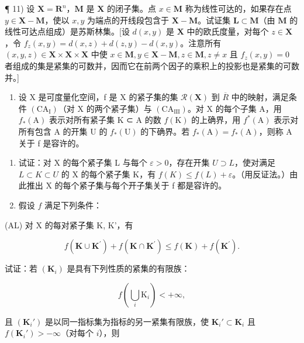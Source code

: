 ¶ 11) 设 \(\mathbf{X} = \mathbf{R}^n\)，\(\mathbf{M}\) 是 \(\mathbf{X}\) 的闭子集。点 \(x \in \mathbf{M}\) 称为线性可达的，如果存在点 \(y \in \mathbf{X} - \mathbf{M}\)，使以 \(x, y\) 为端点的开线段包含于 \(\mathbf{X} - \mathbf{M}\)。试证集 \(\mathbf{L} \subset \mathbf{M}\)（由 \(\mathbf{M}\) 的线性可达点组成）是苏斯林集。{[}设 \(d(x, y)\) 是 \(\mathbf{X}\) 中的欧氏度量，对每个 \(z \in \mathbf{X}\)，令 \(f_z(x, y) = d(x, z) + d(z, y) - d(x, y)\)。注意所有 \((x, y, z) \in \mathbf{X} \times \mathbf{X} \times \mathbf{X}\) 中使 \(x \in \mathbf{M}, y \in \mathbf{X} - \mathbf{M}, z \in \mathbf{M}, z \neq x\) 且 \(f_z(x, y) = 0\) 者组成的集是紧集的可数并，因而它在前两个因子的乘积上的投影也是紧集的可数并。{]}

\begin{enumerate}
\def\labelenumi{\arabic{enumi})}
\setcounter{enumi}{11}
\tightlist
\item
  设 X 是可度量化空间，f 是 X 的紧子集的集 \(\mathcal{R}(\mathbf{X})\) 到 \(\overline{R}\) 中的映射，满足条件 \((\mathrm{CA}_{\mathrm{I}})\)（对 X 的两个紧子集）与 \((\mathrm{CA}_{\mathrm{III}})\)。对 X 的每个子集 A，用 \(f_{*}(\mathrm{A})\) 表示对所有紧子集 K ⊂ A 的数 \(f(\mathrm{K})\) 的上确界，用 \(f^{*}(\mathrm{A})\) 表示对所有包含 A 的开集 U 的 \(f_{*}(\mathrm{U})\) 的下确界。若 \(f_{*}(\mathrm{A}) = f_{*}(\mathrm{A})\)，则称 A 关于 f 是容许的。
\end{enumerate}

\begin{enumerate}
\def\labelenumi{\alph{enumi})}
\item
  试证：对 X 的每个紧子集 L 与每个 \(\varepsilon > 0\)，存在开集 \(U \supset L\)，使对满足 \(L \subset K \subset U\) 的 X 的每个紧子集 K，有 \(f(K) \leqslant f(L) + \varepsilon\)。（用反证法。）由此推出 X 的每个紧子集与每个开子集关于 f 都是容许的。
\item
  假设 \(f\) 满足下列条件：
\end{enumerate}

(AL) 对 X 的每对紧子集 K, K'，有

\[
f (\mathbf {K} \cup \mathbf {K} ^ {\prime}) + f (\mathbf {K} \cap \mathbf {K} ^ {\prime}) \leqslant f (\mathbf {K}) + f (\mathbf {K} ^ {\prime}).
\]

试证：若 \((\mathbf{K}_i)\) 是具有下列性质的紧集的有限族：

\[
f \left(\bigcup_ {i} \mathrm{K} _ {i}\right) <   + \infty ,
\]

且 \((\mathbf{K}_i')\) 是以同一指标集为指标的另一紧集有限族，使 \(\mathbf{K}_i' \subset \mathbf{K}_i\) 且 \(f(\mathbf{K}_i') > -\infty\)（对每个 \(i\)），则

